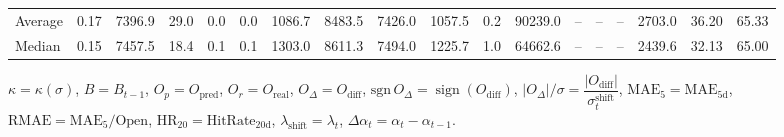 \begin{threeparttable}
{\begin{tabular}{lrrrrrrrrrrrrrrrrr}
Average &     0.17 & 7396.9 &              29.0 &               0.0 &                0.0 &             1086.7 &  8483.5 & 7426.0 &     1057.5 &                      0.2 &             90239.0 &         -- &        -- &             -- &           2703.0 &           36.20 &                  65.33 \\
 Median &     0.15 & 7457.5 &              18.4 &               0.1 &                0.1 &             1303.0 &  8611.3 & 7494.0 &     1225.7 &                      1.0 &             64662.6 &         -- &        -- &             -- &           2439.6 &           32.13 &                  65.00 \\
\bottomrule
\end{tabular}
}
\begin{tablenotes}\footnotesize
\item $\kappa=\kappa(\sigma)$, $B=B_{t-1}$, $O_p=O_{\text{pred}}$, $O_r=O_{\text{real}}$, $O_\Delta=O_{\text{diff}}$, $\mathrm{sgn}\,O_\Delta=\operatorname{sign}(O_{\text{diff}})$, $|O_\Delta|/\sigma=\dfrac{|O_{\text{diff}}|}{\sigma_t^{\text{shift}}}$, $\mathrm{MAE}_5=\mathrm{MAE}_{5\text{d}}$, $\mathrm{RMAE}= \mathrm{MAE}_5 / \text{Open}$, $\mathrm{HR}_{20}=\mathrm{HitRate}_{20\text{d}}$, 
$\lambda_{\text{shift}}=\lambda_t$, 
$\Delta\alpha_t=\alpha_t-\alpha_{t-1}$.
\end{tablenotes}
\end{threeparttable}
\endgroup

